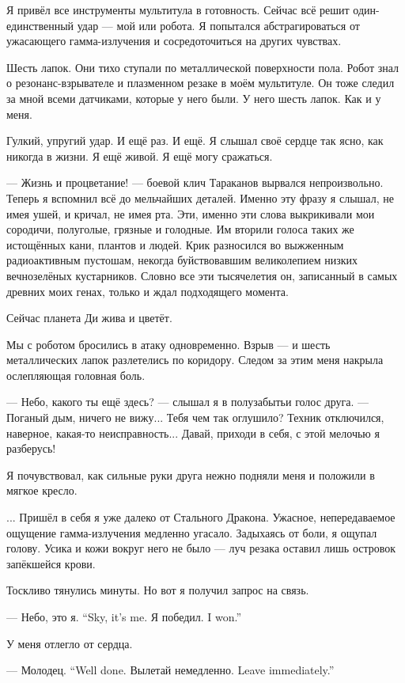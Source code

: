 Я привёл все инструменты мультитула в готовность.
Сейчас всё решит один-единственный удар --- мой или робота.
Я попытался абстрагироваться от ужасающего гамма-излучения и сосредоточиться на других чувствах.

Шесть лапок.
Они тихо ступали по металлической поверхности пола.
Робот знал о резонанс-взрывателе и плазменном резаке в моём мультитуле.
Он тоже следил за мной всеми датчиками, которые у него были.
У него шесть лапок.
Как и у меня.

Гулкий, упругий удар.
И ещё раз.
И ещё.
Я слышал своё сердце так ясно, как никогда в жизни.
Я ещё живой.
Я ещё могу сражаться.

--- Жизнь и процветание! --- боевой клич Тараканов вырвался непроизвольно.
Теперь я вспомнил всё до мельчайших деталей.
Именно эту фразу я слышал, не имея ушей, и кричал, не имея рта.
Эти, именно эти слова выкрикивали мои сородичи, полуголые, грязные и голодные.
Им вторили голоса таких же истощённых кани, плантов и людей.
Крик разносился во выжженным радиоактивным пустошам, некогда буйствовавшим великолепием низких вечнозелёных кустарников.
Словно все эти тысячелетия он, записанный в самых древних моих генах, только и ждал подходящего момента.

Сейчас планета Ди жива и цветёт.

Мы с роботом бросились в атаку одновременно.
Взрыв --- и шесть металлических лапок разлетелись по коридору.
Следом за этим меня накрыла ослепляющая головная боль.

--- Небо, какого ты ещё здесь? --- слышал я в полузабытьи голос друга.
--- Поганый дым, ничего не вижу...
Тебя чем так оглушило?
Техник отключился, наверное, какая-то неисправность...
Давай, приходи в себя, с этой мелочью я разберусь!

Я почувствовал, как сильные руки друга нежно подняли меня и положили в мягкое кресло.

... Пришёл в себя я уже далеко от Стального Дракона.
Ужасное, непередаваемое ощущение гамма-излучения медленно угасало.
Задыхаясь от боли, я ощупал голову.
Усика и кожи вокруг него не было --- луч резака оставил лишь островок запёкшейся крови.

Тоскливо тянулись минуты.
Но вот я получил запрос на связь.

{--- Небо, это я.}
{``Sky, it's me.}
{Я победил.}
{I won.''}

У меня отлегло от сердца.

{--- Молодец.}
{``Well done.}
{Вылетай немедленно.}
{Leave immediately.''}

